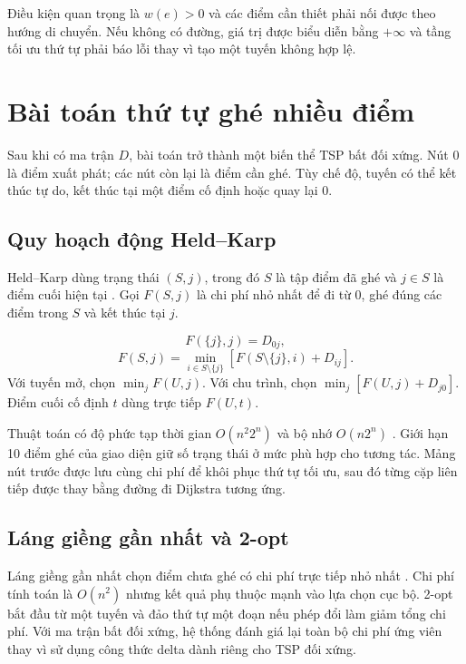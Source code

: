 Điều kiện quan trọng là $w(e)>0$ và các điểm cần thiết phải nối được theo hướng
di chuyển. Nếu không có đường, giá trị được biểu diễn bằng $+\infty$ và tầng tối
ưu thứ tự phải báo lỗi thay vì tạo một tuyến không hợp lệ.

\section{Bài toán thứ tự ghé nhiều điểm}

Sau khi có ma trận $D$, bài toán trở thành một biến thể TSP bất đối xứng. Nút 0
là điểm xuất phát; các nút còn lại là điểm cần ghé. Tùy chế độ, tuyến có thể kết
thúc tự do, kết thúc tại một điểm cố định hoặc quay lại 0.

\subsection{Quy hoạch động Held--Karp}

Held--Karp dùng trạng thái $(S,j)$, trong đó $S$ là tập điểm đã ghé và $j\in S$
là điểm cuối hiện tại \cite{heldkarp1962}. Gọi $F(S,j)$ là chi phí nhỏ nhất để
đi từ 0, ghé đúng các điểm trong $S$ và kết thúc tại $j$.

\begin{formulabox}[title={Truy hồi Held--Karp}]
\[
F(\{j\},j)=D_{0j},
\]
\[
F(S,j)=\min_{i\in S\setminus\{j\}}
  \left[F(S\setminus\{j\},i)+D_{ij}\right].
\]
Với tuyến mở, chọn $\min_j F(U,j)$. Với chu trình, chọn
$\min_j[F(U,j)+D_{j0}]$. Điểm cuối cố định $t$ dùng trực tiếp $F(U,t)$.
\end{formulabox}

Thuật toán có độ phức tạp thời gian $O(n^2 2^n)$ và bộ nhớ $O(n2^n)$
\cite{bellman1962,cormen2009}. Giới hạn
10 điểm ghé của giao diện giữ số trạng thái ở mức phù hợp cho tương tác. Mảng
nút trước được lưu cùng chi phí để khôi phục thứ tự tối ưu, sau đó từng cặp liên
tiếp được thay bằng đường đi Dijkstra tương ứng.

\subsection{Láng giềng gần nhất và 2-opt}
\label{sec:nn-2opt}

Láng giềng gần nhất chọn điểm chưa ghé có chi phí trực tiếp nhỏ nhất
\cite{rosenkrantz1977}. Chi phí
tính toán là $O(n^2)$ nhưng kết quả phụ thuộc mạnh vào lựa chọn cục bộ. 2-opt \cite{croes1958} bắt
đầu từ một tuyến và đảo thứ tự một đoạn nếu phép đổi làm giảm tổng chi phí. Với
ma trận bất đối xứng, hệ thống đánh giá lại toàn bộ chi phí ứng viên thay vì sử
dụng công thức delta dành riêng cho TSP đối xứng.

